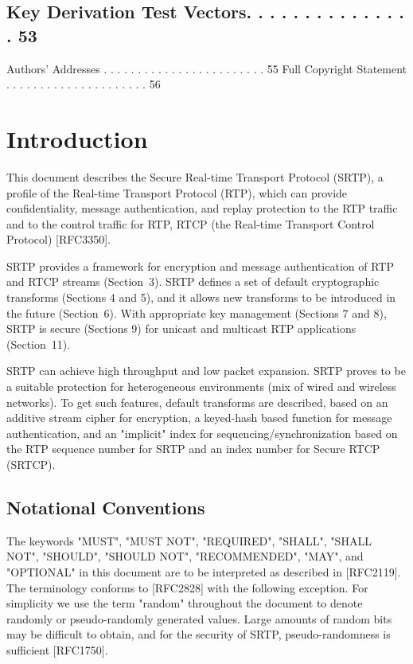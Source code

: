 \documentclass{article}
\begin{document}
\subsection{Key Derivation Test Vectors. . . . . . . . . . . . . . . 53}

Authors' Addresses . . . . . . . . . . . . . . . . . . . . . . . . 55 Full Copyright Statement . . . . . . . . . . . . . . . . . . . . . 56

\section{Introduction}

This document describes the Secure Real-time Transport Protocol (SRTP), a profile of the Real-time Transport Protocol (RTP), which can provide confidentiality, message authentication, and replay protection to the RTP traffic and to the control traffic for RTP, RTCP (the Real-time Transport Control Protocol) [RFC3350].

SRTP provides a framework for encryption and message authentication of RTP and RTCP streams (Section~3).  SRTP defines a set of default cryptographic transforms (Sections 4 and 5), and it allows new transforms to be introduced in the future (Section~6).  With appropriate key management (Sections 7 and 8), SRTP is secure (Sections 9) for unicast and multicast RTP applications (Section~11).

SRTP can achieve high throughput and low packet expansion.  SRTP proves to be a suitable protection for heterogeneous environments (mix of wired and wireless networks).  To get such features, default transforms are described, based on an additive stream cipher for encryption, a keyed-hash based function for message authentication, and an "implicit" index for sequencing/synchronization based on the RTP sequence number for SRTP and an index number for Secure RTCP (SRTCP).

\subsection{Notational Conventions}

The keywords "MUST", "MUST NOT", "REQUIRED", "SHALL", "SHALL NOT", "SHOULD", "SHOULD NOT", "RECOMMENDED", "MAY", and "OPTIONAL" in this document are to be interpreted as described in [RFC2119].  The terminology conforms to [RFC2828] with the following exception.  For simplicity we use the term "random" throughout the document to denote randomly or pseudo-randomly generated values.  Large amounts of random bits may be difficult to obtain, and for the security of SRTP, pseudo-randomness is sufficient [RFC1750].
\end{document}
